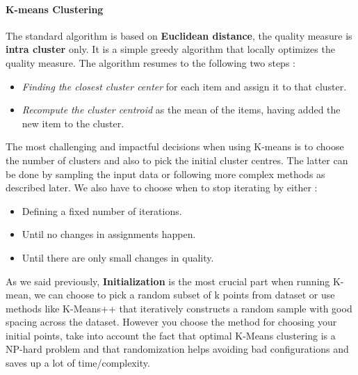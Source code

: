 \paragraph{K-means Clustering}

The standard algorithm is based on \textbf{Euclidean distance}, the quality measure is \textbf{intra cluster} only. It is a simple greedy algorithm that locally optimizes the quality measure. The algorithm resumes to the following two steps :
\begin{itemize}
	\item \emph{Finding the closest cluster center} for each item and assign it to that cluster.
	\item \emph{Recompute the cluster centroid} as the mean of the items, having added the new item to the cluster.
\end{itemize}
The most challenging and impactful decisions when using K-means is to choose the number of clusters and also to pick the initial cluster centres. The latter can be done by sampling the input data or following more complex methods as described later. We also have to choose when to stop iterating by either :
\begin{itemize}
	\item Defining a fixed number of iterations.
	\item Until no changes in assignments happen.
	\item Until there are only small changes in quality.
\end{itemize}

As we said previously, \textbf{Initialization} is the most crucial part when running K-mean, we can choose to pick a random subset of k points from dataset or use methods like K-Means++ that iteratively constructs a random sample with good spacing across the dataset. However you choose the method for choosing your initial points, take into account the fact that optimal K-Means clustering is a NP-hard problem and that randomization helps avoiding bad configurations and saves up a lot of time/complexity.

